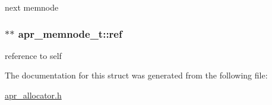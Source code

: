 next memnode \hypertarget{structapr__memnode__t_ac68a939c0c3d48498ec0c0fde409c502}{
\subsubsection[{ref}]{$\ast$$\ast$ apr\-\_\-memnode\-\_\-t\-::ref}}\label{structapr__memnode__t_ac68a939c0c3d48498ec0c0fde409c502}
reference to self 

The documentation for this struct was generated from the following file\-:\begin{DoxyCompactItemize}
\item 
\hyperlink{apr__allocator_8h}{apr\-\_\-allocator.\-h}\end{DoxyCompactItemize}
